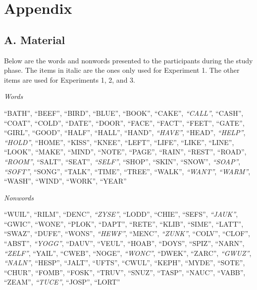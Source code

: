 \documentclass[english,,man,floatsintext]{apa6}
\begin{document}
\endgroup

\newpage

\hypertarget{appendix}{%
\section{Appendix}\label{appendix}}

\hypertarget{a.-material}{%
\subsection{A. Material}\label{a.-material}}

Below are the words and nonwords presented to the participants during the study phase. The items in italic are the ones only used for Experiment 1. The other items are used for Experiments 1, 2, and 3.

\emph{Words}

\enquote{BATH}, \enquote{BEEF}, \enquote{BIRD}, \enquote{BLUE}, \enquote{BOOK}, \enquote{CAKE}, \emph{\enquote{CALL}}, \enquote{CASH}, \enquote{COAT}, \enquote{COLD}, \enquote{DATE}, \enquote{DOOR}, \enquote{FACE}, \enquote{FACT}, \enquote{FEET}, \enquote{GATE}, \enquote{GIRL}, \enquote{GOOD}, \enquote{HALF}, \enquote{HALL}, \enquote{HAND}, \emph{\enquote{HAVE}}, \enquote{HEAD}, \emph{\enquote{HELP}}, \emph{\enquote{HOLD}}, \enquote{HOME}, \enquote{KISS}, \enquote{KNEE}, \enquote{LEFT}, \enquote{LIFE}, \enquote{LIKE}, \enquote{LINE}, \enquote{LOOK}, \enquote{MAKE}, \enquote{MIND}, \enquote{NOTE}, \enquote{PAGE}, \enquote{RAIN}, \enquote{REST}, \enquote{ROAD}, \emph{\enquote{ROOM}}, \enquote{SALT}, \enquote{SEAT}, \emph{\enquote{SELF}}, \enquote{SHOP}, \enquote{SKIN}, \enquote{SNOW}, \emph{\enquote{SOAP}}, \emph{\enquote{SOFT}}, \enquote{SONG}, \enquote{TALK}, \enquote{TIME}, \enquote{TREE}, \enquote{WALK}, \emph{\enquote{WANT}}, \emph{\enquote{WARM}}, \enquote{WASH}, \enquote{WIND}, \enquote{WORK}, \enquote{YEAR}

\emph{Nonwords}

\enquote{WUIL}, \enquote{RILM}, \enquote{DENC}, \emph{\enquote{ZYSE}}, \enquote{LODD}, \enquote{CHIE}, \enquote{SEFS}, \emph{\enquote{JAUK}}, \enquote{GWIC}, \enquote{WONE}, \enquote{PLOK}, \enquote{DAPT}, \enquote{RETE}, \enquote{KLIB}, \enquote{SIME}, \enquote{LATT}, \enquote{SWAZ}, \enquote{DUFE}, \enquote{WONS}, \emph{\enquote{HEWF}}, \enquote{MENC}, \emph{\enquote{ZUNK}}, \enquote{COLV}, \enquote{CLOF}, \enquote{ABST}, \emph{\enquote{YOGG}}, \enquote{DAUV}, \enquote{VEUL}, \enquote{HOAB}, \enquote{DOYS}, \enquote{SPIZ}, \enquote{NARN}, \emph{\enquote{ZELF}}, \enquote{YAIL}, \enquote{CWEB}, \enquote{NOGE}, \emph{\enquote{WONC}}, \enquote{DWEK}, \enquote{ZARC}, \emph{\enquote{GWUZ}}, \emph{\enquote{NALN}}, \enquote{HESP}, \enquote{JALT}, \enquote{UFTS}, \enquote{CWUL}, \enquote{KEPH}, \enquote{MYDE}, \enquote{SOTE}, \enquote{CHUR}, \enquote{FOMB}, \enquote{FOSK}, \enquote{TRUV}, \enquote{SNUZ}, \enquote{TASP}, \enquote{NAUC}, \enquote{VABB}, \enquote{ZEAM}, \emph{\enquote{TUCE}}, \enquote{JOSP}, \enquote{LORT}
\end{document}
